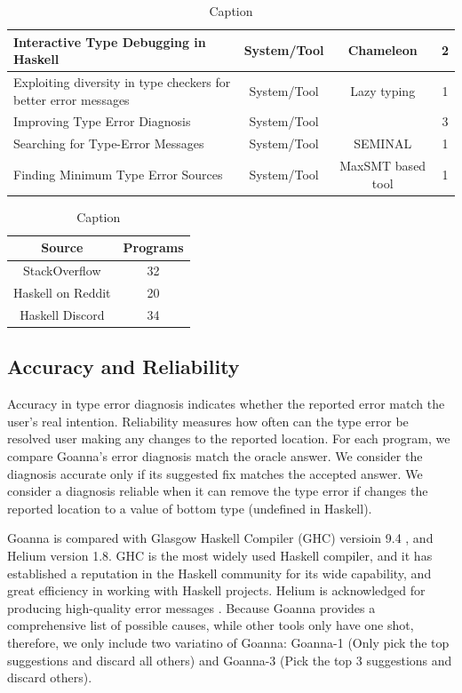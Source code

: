 \documentclass[pdflatex,sn-mathphys-num]{sn-jnl}%
\begin{document}
\begin{table}
\begin{tabular}{|p{5cm}|c|c|c|}
         \raggedright Interactive Type Debugging in Haskell & System/Tool & Chameleon & 2 \\ \hline
         \raggedright Exploiting diversity in type checkers for better error messages & System/Tool & Lazy typing & 1 \\ \hline
         \raggedright Improving Type Error Diagnosis & System/Tool &  & 3 \\ \hline
         \raggedright Searching for Type-Error Messages & System/Tool & SEMINAL &  1\\ \hline
         \raggedright Finding Minimum Type Error Sources & System/Tool & MaxSMT based tool & 1 \\ \hline
    \end{tabular}
    \caption{Caption}
    \label{tab:my_label}
\end{table}

\begin{table}
    \centering
    \begin{tabular}{|c|c|} \hline 
         \textbf{Source} & \textbf{Programs} \\ \hline 
         StackOverflow &  32 \\ \hline 
         Haskell on Reddit & 20 \\ \hline 
         Haskell Discord & 34 \\ \hline 
    \end{tabular}
    \caption{Caption}
    \label{tab:my_label}
\end{table}
 	\subsection{Accuracy and Reliability}\label{sub:eval-accuracy}

	Accuracy in type error diagnosis indicates whether the reported error match the user's real intention. Reliability measures how often can the type error be resolved user making any changes to the reported location. For each program, we compare Goanna's error diagnosis match the oracle answer. We consider the diagnosis accurate only if its suggested fix matches the accepted answer. We consider a diagnosis reliable when it can remove the type error if changes the reported location to a value of bottom type (undefined in Haskell).
  
  Goanna is compared with Glasgow Haskell Compiler (GHC) versioin 9.4 \cite{Gamari_undated-zu}, and Helium \cite{Hage2023-kk} version 1.8. GHC is the most widely used Haskell compiler, and it has established a reputation in the Haskell community for its wide capability, and great efficiency in working with Haskell projects. Helium is acknowledged for producing high-quality error messages \cite{Heeren2003-kd}. Because Goanna provides a comprehensive list of possible causes, while other tools only have one shot, therefore, we only include two variatino of Goanna: Goanna-1 (Only pick the top suggestions and discard all others) and Goanna-3 (Pick the top 3 suggestions and discard others).
\end{document}
